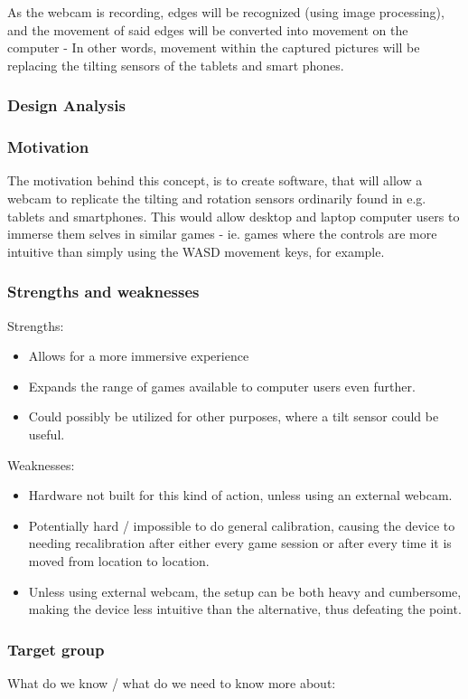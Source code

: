 As the webcam is recording, edges will be recognized (using image processing), and the movement of said edges will be converted into movement on the computer - In other words, movement within the captured pictures will be replacing the tilting sensors of the tablets and smart phones.

\subsubsection*{Design Analysis}
\subsubsection*{Motivation}
The motivation behind this concept, is to create software, that will allow a webcam to replicate the tilting and rotation sensors ordinarily found in e.g. tablets and smartphones. This would allow desktop and laptop computer users to immerse them selves in similar games - ie. games where the controls are more intuitive than simply using the WASD movement keys, for example.

\subsubsection*{Strengths and weaknesses}
Strengths:
\begin{itemize}
\item Allows for a more immersive experience
\item Expands the range of games available to computer users even further.
\item Could possibly be utilized for other purposes, where a tilt sensor could be useful.
\end{itemize}
Weaknesses:
\begin{itemize}
\item Hardware not built for this kind of action, unless using an external webcam.
\item Potentially hard / impossible to do general calibration, causing the device to needing 	recalibration after either every  game session or after every time it is moved from location to 	location.
\item Unless using external webcam, the setup can be both heavy and cumbersome, making the 	device less intuitive than the alternative, thus defeating the point.
\end{itemize}

\subsubsection*{Target group}
What do we know / what do we need to know more about:

